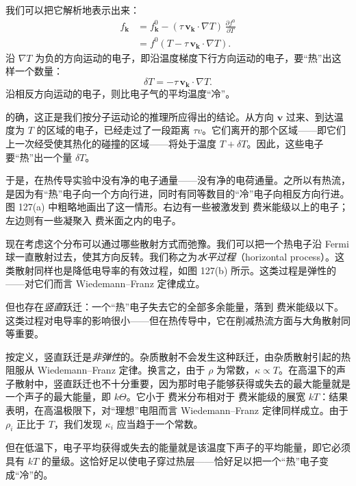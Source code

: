 我们可以把它解析地表示出来：
\begin{align*}
f_{\mathbf{k}}&=f^{0}_{\mathbf{k}}-(\tau\,\mathbf{v}_{\mathbf{k}}\cdot\nabla T)\,\frac{\partial f^{0}}{\partial T}\\
&=f^{0}(T-\tau\,\mathbf{v}_{\mathbf{k}}\cdot\nabla T).\tag{7.94}
\end{align*}
沿 $\nabla T$ 为负的方向运动的电子，即沿温度梯度下行方向运动的电子，要“热”出这样一个数量：
\begin{equation*}
\delta T=-\tau\,\mathbf{v}_{\mathbf{k}}\cdot\nabla T.\tag{7.95}
\end{equation*}
沿相反方向运动的电子，则比电子气的平均温度“冷”。


的确，这正是我们按分子运动论的推理所应得出的结论。从方向 $\mathbf{v}$ 过来、到达温度为 $T$ 的区域的电子，已经走过了一段距离 $\tau v$。它们离开的那个区域——即它们上一次经受使其热化的碰撞的区域——将处于温度 $T+\delta T$。因此，这些电子要“热”出一个量 $\delta T$。

于是，在热传导实验中没有净的电子通量——没有净的电荷通量。之所以有热流，是因为有“热”电子向一个方向行进，同时有同等数目的“冷”电子向相反方向行进。图 127(a) 中粗略地画出了这一情形。右边有一些被激发到 费米能级以上的电子；左边则有一些凝聚入 费米面之内的电子。

现在考虑这个分布可以通过哪些散射方式而弛豫。我们可以把一个热电子沿 Fermi 球一直散射过去，使其方向反转。我们称之为\emph{水平过程}（horizontal process）。这类散射同样也是降低电导率的有效过程，如图 127(b) 所示。这类过程是弹性的——对它们而言 Wiedemann--Franz 定律成立。

但也存在\emph{竖直}跃迁：一个“热”电子失去它的全部多余能量，落到 费米能级以下。这类过程对电导率的影响很小——但在热传导中，它在削减热流方面与大角散射同等重要。


按定义，竖直跃迁是\emph{非弹性}的。杂质散射不会发生这种跃迁，由杂质散射引起的热阻服从 Wiedemann--Franz 定律。换言之，由于 $\rho$ 为常数，$\kappa\propto T$。在高温下的声子散射中，竖直跃迁也不十分重要，因为那时电子能够获得或失去的最大能量就是一个声子的最大能量，即 $k\Theta$。它小于 费米分布相对于 费米能级的展宽 $kT$：结果表明，在高温极限下，对“理想”电阻而言 Wiedemann--Franz 定律同样成立。由于 $\rho_{i}$ 正比于 $T$，我们发现 $\kappa_{i}$ 应当趋于一个常数。

但在低温下，电子平均获得或失去的能量就是该温度下声子的平均能量，即它必须具有 $kT$ 的量级。这恰好足以使电子穿过热层——恰好足以把一个“热”电子变成“冷”的。

